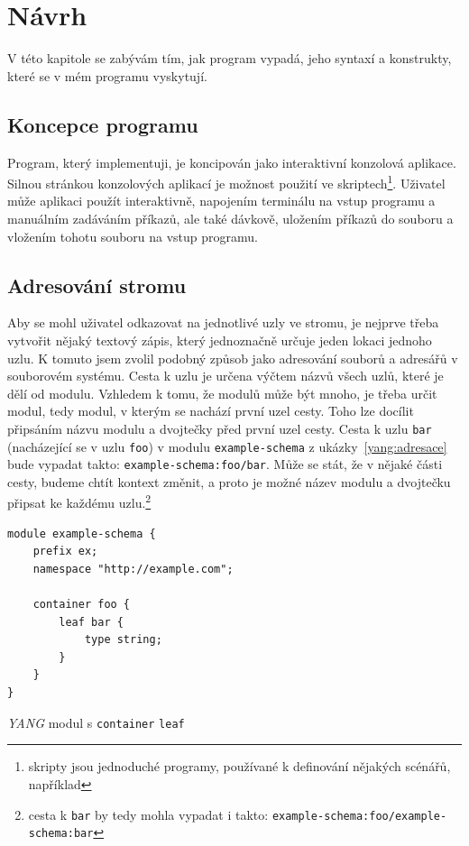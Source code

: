 \documentclass[thesis=B,czech,hidelinks]{FITthesis}[2019/03/06]
\begin{document}
\chapter{Návrh}
V této kapitole se zabývám tím, jak program vypadá, jeho syntaxí a konstrukty, které se v mém programu vyskytují.

\section{Koncepce programu}
Program, který implementuji, je koncipován jako interaktivní konzolová aplikace. Silnou stránkou konzolových aplikací je možnost použití ve skriptech\footnote{skripty jsou jednoduché programy, používané k definování nějakých scénářů, například }. Uživatel může aplikaci použít interaktivně, napojením terminálu na vstup programu a manuálním zadáváním příkazů, ale také dávkově, uložením příkazů do souboru a vložením tohotu souboru na vstup programu.

\section{Adresování stromu}
Aby se mohl uživatel odkazovat na jednotlivé uzly ve stromu, je nejprve třeba vytvořit nějaký textový zápis, který jednoznačně určuje jeden lokaci jednoho uzlu. K tomuto jsem zvolil podobný způsob jako adresování souborů a adresářů v souborovém systému. Cesta k uzlu je určena výčtem názvů všech uzlů, které je dělí od modulu. Vzhledem k tomu, že modulů může být mnoho, je třeba určit  modul, tedy modul, v kterým se nachází první uzel cesty. Toho lze docílit připsáním názvu modulu a dvojtečky před první uzel cesty. Cesta k uzlu \texttt{bar} (nacházející se v uzlu \texttt{foo}) v modulu \texttt{example-schema} z ukázky~\ref{yang:adresace} bude vypadat takto: \texttt{example-schema:foo/bar}. Může se stát, že v nějaké části cesty, budeme chtít kontext změnit, a proto je možné název modulu a dvojtečku připsat ke každému uzlu.\footnote{cesta k \texttt{bar} by tedy mohla vypadat i takto: \texttt{example-schema:foo/example-schema:bar}}

\begin{listing}
\begin{verbatim}
module example-schema {
    prefix ex;
    namespace "http://example.com";

    container foo {
        leaf bar {
            type string;
        }
    }
}
\end{verbatim}
\caption{\textit{YANG} modul s \texttt{container} \texttt{leaf}}\label{yang:adresace}
\end{listing}
\end{document}

